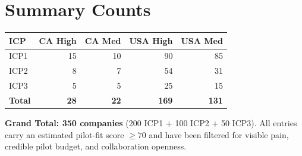 \documentclass[10pt]{article}
\begin{document}
\section*{Summary Counts}
\begin{tabular}{lrrrr}
\hline
\textbf{ICP} & \textbf{CA High} & \textbf{CA Med} & \textbf{USA High} & \textbf{USA Med} \\
\hline
ICP1 & 15 & 10 & 90 & 85 \\
ICP2 & 8 & 7 & 54 & 31 \\
ICP3 & 5 & 5 & 25 & 15 \\
\hline
\textbf{Total} & \textbf{28} & \textbf{22} & \textbf{169} & \textbf{131} \\
\hline
\end{tabular}
\vspace{1em}
\noindent\textbf{Grand Total: 350 companies} (200 ICP1 + 100 ICP2 + 50 ICP3). All entries carry an estimated pilot-fit score $\geq 70$ and have been filtered for visible pain, credible pilot budget, and collaboration openness.
\end{document}

